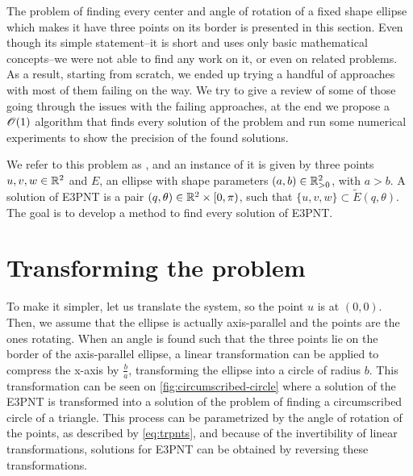 The problem of finding every center and angle of rotation of a fixed shape ellipse which makes it have three points on its border is presented in this section. Even though its simple statement--it is short and uses only basic mathematical concepts--we were not able to find any work on it, or even on related problems. 
As a result, starting from scratch, we ended up trying a handful of approaches with most of them failing on the way. We try to give a review of some of those going through the issues with the failing approaches, at the end we propose a $\mathscr{O}(1)$ algorithm that finds every solution of the problem and run some numerical experiments to show the precision of the found solutions.

We refer to this problem as , and an instance of it is given by three points $u, v, w \in \mathbb{R}^2$ and $E$, an ellipse with shape parameters $(a, b) \in \mathbb{R}^2_{>0}$, with $a > b$. A solution of E3PNT is a pair $(q, \theta) \in \mathbb{R}^2\times[0, \pi)$, such that $\{u, v, w\} \subset \tilde{E}(q, \theta)$.
The goal is to develop a method to find every solution of E3PNT. 


\section{Transforming the problem}

To make it simpler, let us translate the system, so the point $u$ is at $(0,0)$. Then, we assume that the ellipse is actually axis-parallel and the points are the ones rotating. When an angle is found such that the three points lie on the border of the axis-parallel ellipse, a linear transformation can be applied to compress the x-axis by $\frac{b}{a}$, transforming the ellipse into a circle of radius $b$. This transformation can be seen on \autoref{fig:circumscribed-circle} where a solution of the E3PNT is transformed into a solution of the problem of finding a circumscribed circle of a triangle. 
This process can be parametrized by the angle of rotation of the points, as described by \autoref{eq:trpnts}, and because of the invertibility of linear transformations, solutions for E3PNT can be obtained by reversing these transformations.

